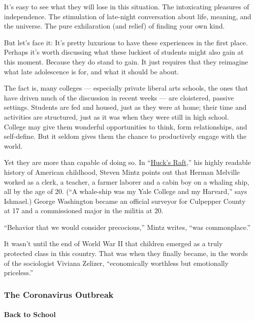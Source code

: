 It's easy to see what they will lose in this situation. The intoxicating
pleasures of independence. The stimulation of late-night conversation
about life, meaning, and the universe. The pure exhilaration (and
relief) of finding your own kind.

But let's face it: It's pretty luxurious to have these experiences in
the first place. Perhaps it's worth discussing what these luckiest of
students might also gain at this moment. Because they do stand to gain.
It just requires that they reimagine what late adolescence is for, and
what it should be about.

The fact is, many colleges --- especially private liberal arts schools,
the ones that have driven much of the discussion in recent weeks --- are
cloistered, passive settings. Students are fed and housed, just as they
were at home; their time and activities are structured, just as it was
when they were still in high school. College may give them wonderful
opportunities to think, form relationships, and self-define. But it
seldom gives them the chance to productively engage with the world.

Yet they are more than capable of doing so. In
``\href{https://www.publishersweekly.com/978-0-674-01508-1}{Huck's
Raft},'' his highly readable history of American childhood, Steven Mintz
points out that Herman Melville worked as a clerk, a teacher, a farmer
laborer and a cabin boy on a whaling ship, all by the age of 20. (``A
whale-ship was my Yale College and my Harvard,'' says Ishmael.) George
Washington became an official surveyor for Culpepper County at 17 and a
commissioned major in the militia at 20.

``Behavior that we would consider precocious,'' Mintz writes, ``was
commonplace.''

It wasn't until the end of World War II that children emerged as a truly
protected class in this country. That was when they finally became, in
the words of the sociologist Viviana Zelizer, ``economically worthless
but emotionally priceless.''

\hypertarget{the-coronavirus-outbreak}{%
\subsubsection{The Coronavirus
Outbreak}\label{the-coronavirus-outbreak}}

\hypertarget{back-to-school}{%
\paragraph{Back to School}\label{back-to-school}}

